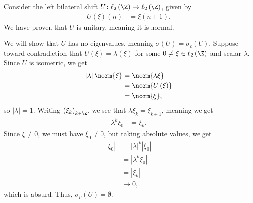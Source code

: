 \documentclass[10pt]{mypackage}
\begin{document}
\begin{example}
  Consider the left bilateral shift $U\colon \ell_2\left(\Z\right) \rightarrow \ell_2\left(\Z\right)$, given by
  \begin{align*}
    U\left(\xi\right)\left(n\right) &= \xi\left(n+1\right).
  \end{align*}
  We have proven that $U$ is unitary, meaning it is normal.\newline

  We will show that $U$ has no eigenvalues, meaning $\sigma\left(U\right) = \sigma_c\left(U\right)$. Suppose toward contradiction that $U\left(\xi\right) = \lambda \left(\xi\right)$ for some $0 \neq \xi\in \ell_2\left(\Z\right)$ and scalar $\lambda$. Since $U$ is isometric, we get
  \begin{align*}
    \left\vert \lambda \right\vert\norm{\xi} &= \norm{\lambda \xi}\\
                                             &= \norm{U\left(\xi\right)}\\
                                             &= \norm{\xi},
  \end{align*}
  so $\left\vert \lambda \right\vert = 1$. Writing $\left(\xi_k\right)_{k\in \Z}$, we see that $\lambda \xi_k = \xi_{k+1}$, meaning we get
  \begin{align*}
    \lambda^k\xi_0 &= \xi_k.
  \end{align*}
  Since $\xi\neq 0$, we must have $\xi_0 \neq 0$, but taking absolute values, we get
  \begin{align*}
    \left\vert \xi_0 \right\vert &= \left\vert \lambda \right\vert^k \left\vert \xi_0 \right\vert\\
                                 &= \left\vert \lambda^k\xi_0 \right\vert\\
                                 &= \left\vert \xi_k \right\vert\\
                                 &\rightarrow 0,
  \end{align*}
  which is absurd. Thus, $\sigma_p\left(U\right) = \emptyset$.\newline


\end{example}
\end{document}
